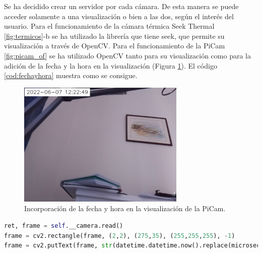 Se ha decidido crear un servidor por cada cámara. De esta manera se puede acceder solamente a una visualización o bien a las dos, según el interés del usuario. Para el funcionamiento de la cámara térmica Seek Thermal \ref{fig:termicos}-b se ha utilizado la librería que tiene seek, que permite su visualización a través de OpenCV. Para el funcionamiento de la PiCam \ref{fig:picam_of} se ha utilizado OpenCV tanto para su visualización como para la adición de la fecha y la hora en la visualización (Figura \ref{fig:fechayhora}). El código \ref{cod:fechayhora} muestra como se consigue.\\
\begin{figure} [h!]
  \begin{center}
    \includegraphics[width=8cm]{figs/fechayhora}
  \end{center}
  \caption{Incorporación de la fecha y hora en la visualización de la PiCam.}
  \label{fig:fechayhora}
\end{figure}

\begin{code}[h]
\begin{lstlisting}[language=Python]
ret, frame = self.__camera.read()
frame = cv2.rectangle(frame, (2,2), (275,35), (255,255,255), -1)
frame = cv2.putText(frame, str(datetime.datetime.now().replace(microsecond=0)), (10,25), cv2.FONT_HERSEY_SIMPLEX, 0.7, (0,0,0), 1, cv2.LINE_AA))
\end{lstlisting}
\caption[Código para incorporar la fecha en la esquina superior izquierda.]{Código para incorporar la fecha en la esquina superior izquierda.}
\label{cod:fechayhora}
\end{code}

